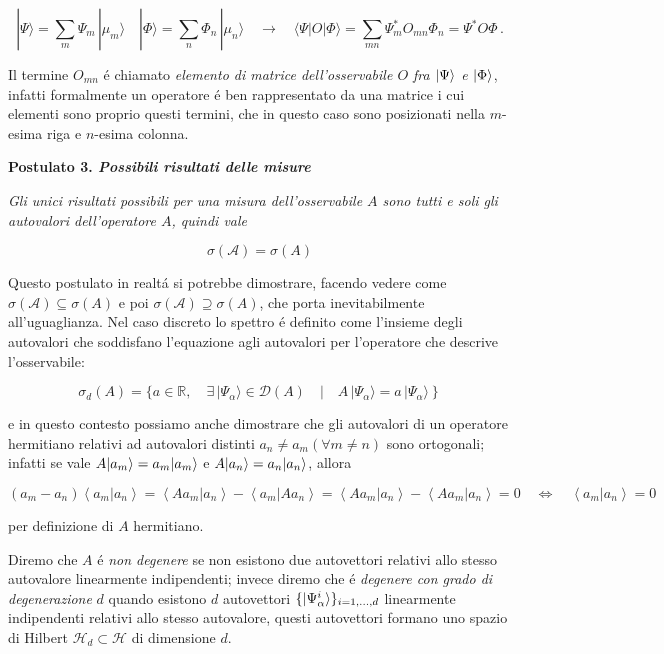 $$|\Psi\rangle=\sum_{m}\Psi_{m}\,|\mu_{m}\rangle\quad|\Phi\rangle=\sum_{n}\Phi_{n}\,|\mu_{n}\rangle\quad\longrightarrow\quad\langle\Psi|O|\Phi\rangle=\sum_{m n}\Psi_{m}^{*}O_{m n}\Phi_{n}=\Psi^{*}O\Phi\,.$$

Il termine $O_{mn}$ \'e chiamato \textit{elemento di matrice dell'osservabile $O$ fra $\ket{\Psi}$ e $\ket{\Phi}$}, infatti formalmente un operatore \'e ben rappresentato da una matrice i cui elementi sono proprio questi termini, che in questo caso sono posizionati nella $m$-esima riga e $n$-esima colonna.

\textbf{Postulato 3. \textit{Possibili risultati delle misure}} 

\textit{Gli unici risultati possibili per una misura dell'osservabile $A$ sono tutti e soli gli autovalori dell'operatore $A$, quindi vale}

$$\sigma({\mathcal{A}})=\sigma(A)$$

Questo postulato in realt\'a si potrebbe dimostrare, facendo vedere come $\sigma(\mathcal{A}) \subseteq \sigma(A)$ e poi $\sigma(\mathcal{A}) \supseteq \sigma(A)$, che porta inevitabilmente all'uguaglianza. Nel caso discreto lo spettro \'e definito come l'insieme degli autovalori che soddisfano l'equazione agli autovalori per l'operatore che descrive l'osservabile:

$$\sigma_{d}(A)=\{a\in\mathbb{R},\quad\exists\,|\Psi_{\alpha}\rangle\in\mathcal{D}(A)\quad\left|\quad A\,|\Psi_{\alpha}\rangle=a\,|\Psi_{\alpha}\rangle\right\}$$

e in questo contesto possiamo anche dimostrare che gli autovalori di un operatore hermitiano relativi ad autovalori distinti $a_n \neq a_m (\forall m \neq n)$ sono ortogonali; infatti se vale $A \ket{a_m} = a_m\ket{a_m}$ e $A \ket{a_n} = a_n \ket{a_n}$, allora

$$\left(a_{m}-a_{n}\right)\left\langle a_{m}|a_{n}\right\rangle=\left\langle Aa_{m}|a_{n}\right\rangle-\left\langle a_{m}|Aa_{n}\right\rangle=\left\langle Aa_{m}|a_{n}\right\rangle-\left\langle Aa_{m}|a_{n}\right\rangle=0\quad\Longleftrightarrow\quad\left\langle a_{m}|a_{n}\right\rangle=0$$

per definizione di $A$ hermitiano.

Diremo che $A$ \'e \textit{non degenere} se non esistono due autovettori relativi allo stesso autovalore linearmente indipendenti; invece diremo che \'e \textit{degenere con grado di degenerazione} $d$ quando esistono $d$ autovettori $ \{ \ket{\Psi_\alpha^i} \}_{i=1, \ldots, d} $ linearmente indipendenti relativi allo stesso autovalore, questi autovettori formano uno spazio di Hilbert $\mathcal{H}_d \subset \mathcal{H}$
di dimensione $d$. 


